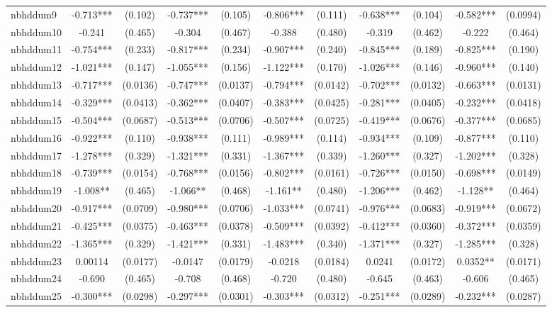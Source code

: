 \documentclass[]{article}
\begin{document}
\begin{tabular}{lcccccccccc}
nbhddum9 & -0.713*** & (0.102) & -0.737*** & (0.105) & -0.806*** & (0.111) & -0.638*** & (0.104) & -0.582*** & (0.0994) \\
nbhddum10 & -0.241 & (0.465) & -0.304 & (0.467) & -0.388 & (0.480) & -0.319 & (0.462) & -0.222 & (0.464) \\
nbhddum11 & -0.754*** & (0.233) & -0.817*** & (0.234) & -0.907*** & (0.240) & -0.845*** & (0.189) & -0.825*** & (0.190) \\
nbhddum12 & -1.021*** & (0.147) & -1.055*** & (0.156) & -1.122*** & (0.170) & -1.026*** & (0.146) & -0.960*** & (0.140) \\
nbhddum13 & -0.717*** & (0.0136) & -0.747*** & (0.0137) & -0.794*** & (0.0142) & -0.702*** & (0.0132) & -0.663*** & (0.0131) \\
nbhddum14 & -0.329*** & (0.0413) & -0.362*** & (0.0407) & -0.383*** & (0.0425) & -0.281*** & (0.0405) & -0.232*** & (0.0418) \\
nbhddum15 & -0.504*** & (0.0687) & -0.513*** & (0.0706) & -0.507*** & (0.0725) & -0.419*** & (0.0676) & -0.377*** & (0.0685) \\
nbhddum16 & -0.922*** & (0.110) & -0.938*** & (0.111) & -0.989*** & (0.114) & -0.934*** & (0.109) & -0.877*** & (0.110) \\
nbhddum17 & -1.278*** & (0.329) & -1.321*** & (0.331) & -1.367*** & (0.339) & -1.260*** & (0.327) & -1.202*** & (0.328) \\
nbhddum18 & -0.739*** & (0.0154) & -0.768*** & (0.0156) & -0.802*** & (0.0161) & -0.726*** & (0.0150) & -0.698*** & (0.0149) \\
nbhddum19 & -1.008** & (0.465) & -1.066** & (0.468) & -1.161** & (0.480) & -1.206*** & (0.462) & -1.128** & (0.464) \\
nbhddum20 & -0.917*** & (0.0709) & -0.980*** & (0.0706) & -1.033*** & (0.0741) & -0.976*** & (0.0683) & -0.919*** & (0.0672) \\
nbhddum21 & -0.425*** & (0.0375) & -0.463*** & (0.0378) & -0.509*** & (0.0392) & -0.412*** & (0.0360) & -0.372*** & (0.0359) \\
nbhddum22 & -1.365*** & (0.329) & -1.421*** & (0.331) & -1.483*** & (0.340) & -1.371*** & (0.327) & -1.285*** & (0.328) \\
nbhddum23 & 0.00114 & (0.0177) & -0.0147 & (0.0179) & -0.0218 & (0.0184) & 0.0241 & (0.0172) & 0.0352** & (0.0171) \\
nbhddum24 & -0.690 & (0.465) & -0.708 & (0.468) & -0.720 & (0.480) & -0.645 & (0.463) & -0.606 & (0.465) \\
nbhddum25 & -0.300*** & (0.0298) & -0.297*** & (0.0301) & -0.303*** & (0.0312) & -0.251*** & (0.0289) & -0.232*** & (0.0287) \\

\end{tabular}
\end{document}
